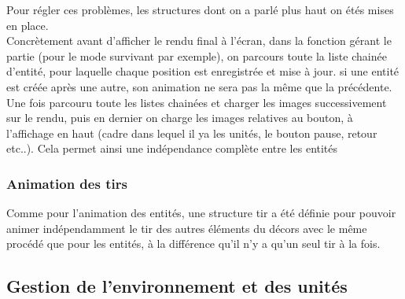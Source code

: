 \documentclass[a4paper,11pt]{article}
\begin{document}
Pour régler ces problèmes, les structures dont on a parlé plus haut on étés mises en place. \\
Concrètement avant d'afficher le rendu final à l'écran, dans la fonction gérant le partie (pour le mode survivant par exemple),
on parcours toute la liste chainée d'entité, pour laquelle chaque position est enregistrée et mise à jour. si une entité est créée
après une autre, son animation ne sera pas la même que la précédente. Une fois parcouru toute les listes chainées et charger les images successivement
sur le rendu, puis en dernier on charge les images relatives au bouton, à l'affichage en haut (cadre dans lequel il ya les unités, le bouton pause, retour etc..).
Cela permet ainsi une indépendance complète entre les entités
\subsubsection{Animation des tirs}
Comme pour l'animation des entités, une structure tir a été définie pour pouvoir 
animer indépendamment le tir des autres éléments du décors avec le même procédé que pour les entités, à la différence qu'il n'y a qu'un seul tir à la fois.
\subsection{Gestion de l'environnement et des unités}
\end{document}
